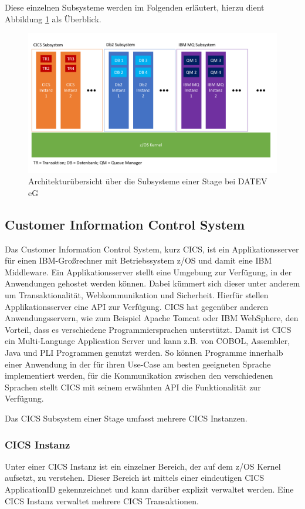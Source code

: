 Diese einzelnen Subsysteme werden im Folgenden erläutert, hierzu dient Abbildung \ref{fig:archüber} als Überblick.

\begin{figure}[h!]
\centering
\includegraphics[width=\textwidth]{figures/architektur.pdf}
\caption{Architekturübersicht über die Subsysteme einer Stage bei DATEV eG}
\label{fig:archüber}
\end{figure}

\subsection{Customer Information Control System}\label{cics}
Das Customer Information Control System, kurz CICS, ist ein Applikationsserver für einen IBM-Großrechner mit Betriebssystem z/OS und damit eine IBM Middleware.
Ein Applikationsserver stellt eine Umgebung zur Verfügung, in der Anwendungen gehostet werden können.
Dabei kümmert sich dieser unter anderem um Transaktionalität, Webkommunikation und Sicherheit.
Hierfür stellen Applikationsserver eine API zur Verfügung.
CICS hat gegenüber anderen Anwendungsservern, wie zum Beispiel \glqq Apache Tomcat\grqq{} oder \glqq IBM WebSphere\grqq,  den Vorteil, dass es verschiedene Programmiersprachen unterstützt.
Damit ist CICS ein Multi-Language Application Server und kann z.B. von COBOL, Assembler, Java und PLI Programmen genutzt werden.
So können Programme innerhalb einer Anwendung in der für ihren Use-Case am besten geeigneten Sprache implementiert werden, für die Kommunikation zwischen den verschiedenen Sprachen stellt  CICS mit seinem erwähnten API die Funktionalität zur Verfügung.
\cite[S. 4]{Rayns.2011}

Das CICS Subsystem einer Stage umfasst mehrere CICS Instanzen.

\subsubsection{CICS Instanz} 
Unter einer CICS Instanz ist ein einzelner Bereich, der auf dem z/OS Kernel aufsetzt, zu verstehen.
Dieser Bereich ist mittels einer eindeutigen CICS ApplicationID gekennzeichnet und kann darüber explizit verwaltet werden.
Eine CICS Instanz verwaltet mehrere CICS Transaktionen.

